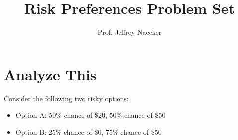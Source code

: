 \documentclass[solutions]{problem-set}
\title{Risk Preferences Problem Set}
\author{Prof. Jeffrey Naecker}
\date{}
\begin{document}
\maketitle

\section{Analyze This}
Consider the following two risky options:

\begin{itemize}
    \item Option A: 50\% chance of \$20, 50\% chance of \$50
    \item Option B: 25\% chance of \$0, 75\% chance of \$50
\end{itemize}
\end{document}
